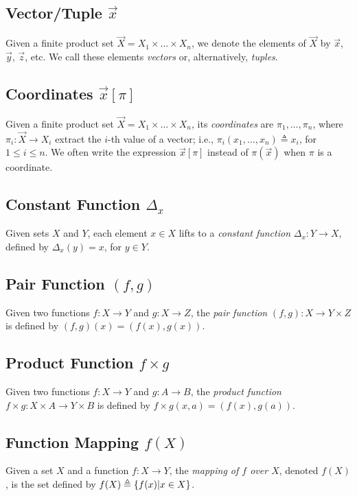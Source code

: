 \subsection{Vector/Tuple $\vec{x}$}
Given a finite product set $\vec{X}=X_1\times \ldots \times X_n$, we denote the elements of $\vec{X}$ by $\vec{x}$, $\vec{y}$, $\vec{z}$, etc. We call these elements \emph{vectors} or, alternatively, \emph{tuples}. 

\subsection{Coordinates $\vec{x}[\pi]$}
Given a finite product set $\vec{X}=X_1\times \ldots \times X_n$, its \emph{coordinates} are $\pi_1, \ldots, \pi_n$, where $\pi_i\colon \vec{X} \rightarrow X_i$ extract the $i$-th value of a vector; i.e., $\pi_i(x_1, \ldots, x_n)\triangleq x_i$, for $1\leq i \leq n$. We often write the expression $\vec{x}[\pi]$ instead of $\pi(\vec{x})$ when $\pi$ is a coordinate.

\subsection{Constant Function $\Delta_x$}
Given sets $X$ and $Y$, each element $x\in X$ lifts to a \emph{constant function} $\Delta_x\colon Y\rightarrow X$, defined by $\Delta_x(y)=x$, for $y\in Y$.

\subsection{Pair Function $(f,g)$}
Given two functions $f\colon X\rightarrow Y$ and $g\colon X\rightarrow Z$, the \emph{pair function} $(f,g)\colon X\rightarrow Y\times Z$ is defined by $(f,g)(x)=(f(x),g(x))$.

\subsection{Product Function $f\times g$}
Given two functions $f\colon X\rightarrow Y$ and $g\colon A\rightarrow B$, the \emph{product function} $f\times g\colon X\times A\rightarrow Y\times B$ is defined by $f\times g(x,a)=(f(x),g(a))$.

\subsection{Function Mapping $f(X)$}
Given a set $X$ and a function $f\colon X\rightarrow Y$, the \emph{mapping of $f$ over $X$}, denoted $f(X)$, is the set defined by $f(X)\triangleq\left\{f(x)| x\in X\right\}$.

